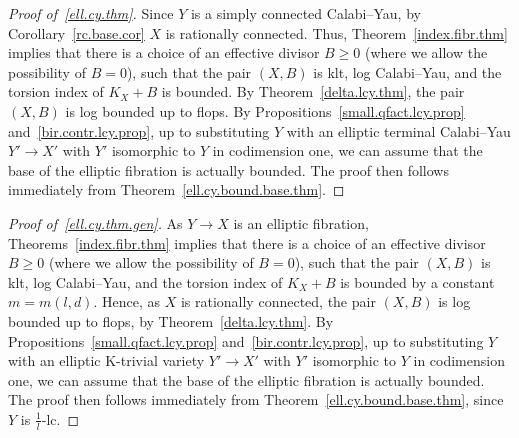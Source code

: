 \documentclass[11pt]{ip-journal}
\theoremstyle{definition}
\begin{document}
\begin{proof}[Proof of~\ref{ell.cy.thm}]
Since $Y$ is a simply connected Calabi--Yau, by Corollary~\ref{rc.base.cor} $X$ is rationally connected. 
Thus, Theorem~\ref{index.fibr.thm} implies that there is a choice of an effective divisor $B \geq 0$ (where we allow the possibility of $B=0$), such that the pair $(X, B)$ is klt, log Calabi--Yau, and the torsion index of $K_X+B$ is bounded.  
By Theorem~\ref{delta.lcy.thm}, the pair $(X, B)$ is log bounded up to flops.
By Propositions~\ref{small.qfact.lcy.prop} and~\ref{bir.contr.lcy.prop}, up to substituting $Y$ with an elliptic terminal Calabi--Yau $Y' \to X'$ with $Y'$ isomorphic to $Y$ in codimension one, we can assume that the base of the elliptic fibration is actually bounded.
The proof then follows immediately from Theorem~\ref{ell.cy.bound.base.thm}. 
\end{proof}

\begin{proof}[Proof of~\ref{ell.cy.thm.gen}]
As $Y \to X$ is an elliptic fibration, Theorems~\ref{index.fibr.thm}  implies that there is a choice of an effective divisor $B \geq 0$ (where we allow the possibility of $B=0$), such that the pair $(X, B)$ is klt, log Calabi--Yau, and the torsion index of $K_X+B$ is bounded
by a constant $m=m(l,d)$.
Hence, as $X$ is rationally connected, the pair $(X, B)$ is log bounded up to flops, by Theorem~\ref{delta.lcy.thm}.
By Propositions~\ref{small.qfact.lcy.prop} and~\ref{bir.contr.lcy.prop}, up to substituting $Y$ with an elliptic K-trivial variety $Y' \to X'$ with $Y'$ isomorphic to $Y$ in codimension one, we can assume that the base of the elliptic fibration is actually bounded.
The proof then follows immediately from Theorem~\ref{ell.cy.bound.base.thm}, since $Y$ is $\frac 1 l$-lc.
\end{proof}
\end{document}
